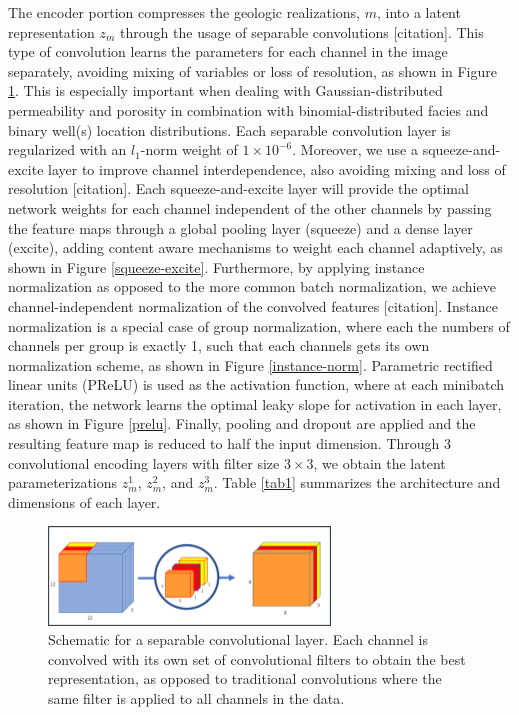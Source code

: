 \documentclass[10pt, twoside]{article}
\begin{document}
The encoder portion compresses the geologic realizations, $m$, into a latent representation $z_m$ through the usage of separable convolutions [citation]. This type of convolution learns the parameters for each channel in the image separately, avoiding mixing of variables or loss of resolution, as shown in Figure \ref{sepconv}. This is especially important when dealing with Gaussian-distributed permeability and porosity in combination with binomial-distributed facies and binary well(s) location distributions. Each separable convolution layer is regularized with an $l_1$-norm weight of $1\times10^{-6}$. Moreover, we use a squeeze-and-excite layer to improve channel interdependence, also avoiding mixing and loss of resolution [citation]. Each squeeze-and-excite layer will provide the optimal network weights for each channel independent of the other channels by passing the feature maps through a global pooling layer (squeeze) and a dense layer (excite), adding content aware mechanisms to weight each channel adaptively, as shown in Figure \ref{squeeze-excite}. Furthermore, by applying instance normalization as opposed to the more common batch normalization, we achieve channel-independent normalization of the convolved features [citation]. Instance normalization is a special case of group normalization, where each the numbers of channels per group is exactly 1, such that each channels gets its own normalization scheme, as shown in Figure \ref{instance-norm}. Parametric rectified linear units (PReLU) is used as the activation function, where at each minibatch iteration, the network learns the optimal leaky slope for activation in each layer, as shown in Figure \ref{prelu}. Finally, pooling and dropout are applied and the resulting feature map is reduced to half the input dimension. Through 3 convolutional encoding layers with filter size $3\times3$, we obtain the latent parameterizations $z_m^1$, $z_m^2$, and $z_m^3$. Table \ref{tab1} summarizes the architecture and dimensions of each layer.

\begin{figure}[h]
    \centering
    \includegraphics[width=7.5cm]{figures/sepconv.png}
    \caption{Schematic for a separable convolutional layer. Each channel is convolved with its own set of convolutional filters to obtain the best representation, as opposed to traditional convolutions where the same filter is applied to all channels in the data.}
    \label{sepconv}
\end{figure}
\end{document}
